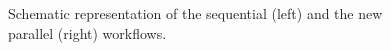 \begin{figure}[!htp]
	\begin{center}
		\caption{Schematic representation of the \ttDilepKinFit sequential (left) and the new parallel (right) workflows.}
		\label{fig:SeqPipeline}
	\end{center}
\end{figure}

